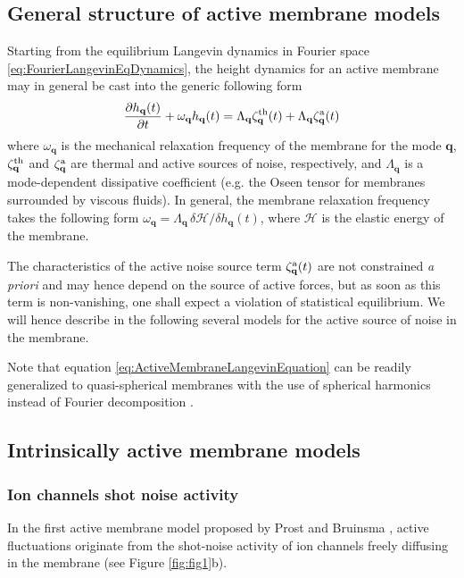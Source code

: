 \documentclass[graybox]{svmult}
\begin{document}
	\subsection{General structure of active membrane models}
Starting from the equilibrium Langevin dynamics in Fourier space \eqref{eq:FourierLangevinEqDynamics},  the height dynamics for an active membrane may in general be cast into the generic following form 
\begin{equation}
\label{eq:ActiveMembraneLangevinEquation}
	\frac{\partial h_{\mathbf{q}}(t)}{\partial t} + \omega_{\mathbf{q}}h_{\mathbf{q}}(t) = \Lambda_{\mathbf{q}}\zeta_{\mathbf{q}}^{\rm{th}}(t) + \Lambda_{\mathbf{q}}\zeta_{\mathbf{q}}^{\rm{a}}(t)
\end{equation}
where $\omega_{\mathbf{q}}$ is the mechanical relaxation frequency of the membrane for the mode $\mathbf{q}$, $\zeta_{\mathbf{q}}^{\rm{th}}$ and $\zeta_{\mathbf{q}}^{\rm{a}}$ are thermal and active sources of noise, respectively, and $\Lambda_{\mathbf{q}}$ is a mode-dependent dissipative coefficient (e.g. the Oseen tensor for membranes surrounded by viscous fluids). In general, the membrane relaxation frequency takes the following form $\omega_{\mathbf{q}} = \Lambda_{\mathbf{q}}\,\delta \mathcal{H}/\delta h_{\mathbf{q}}(t)$, where $\mathcal{H}$ is the elastic energy of the membrane. 

The characteristics of the active noise source term $\zeta_{\mathbf{q}}^{\rm{a}}(t)$ are not constrained \textit{a priori} and may hence depend on the source of active forces, but as soon as this term is non-vanishing, one shall expect a violation of statistical equilibrium. We will hence describe in the following several models for the active source of noise in the membrane.

Note that equation \eqref{eq:ActiveMembraneLangevinEquation} can be readily generalized to quasi-spherical membranes with the use of spherical harmonics instead of Fourier decomposition \cite{Milner:1987, Lomholt:2006, Loubet:2012}.

	\subsection{Intrinsically active membrane models}
		\subsubsection{Ion channels shot noise activity}
		In the first active membrane model proposed by Prost and Bruinsma \cite{Prost:1996}, active fluctuations originate from the shot-noise activity of ion channels freely diffusing in the membrane (see Figure \ref{fig:fig1}b). 
		
\end{document}
